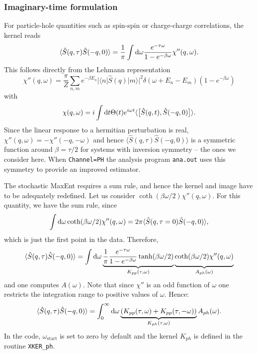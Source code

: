 \subsubsection*{Imaginary-time formulation}
 For particle-hole quantities such as spin-spin or charge-charge correlations, 
the kernel reads
\begin{equation}
	\langle \hat{S}(q,\tau) \hat{S}(-q,0) \rangle  = \frac{1}{\pi} 
   \int \mathrm{d} \omega  \frac{e^{- \tau \omega} }{ 1 - e^{-\beta  \omega} } \chi''(q,\omega).
\end{equation}
This follows directly from the  Lehmann representation
\begin{equation}
 \chi''(q,\omega)  = \frac{\pi}{Z} \sum_{n,m} e^{-\beta E_n} |\langle n | \hat{S}(q) | m \rangle |^2 
\delta ( \omega + E_n - E_m) \left( 1 - e^{-\beta  \omega} \right) 
\end{equation}
with 
\begin{equation*}
   \chi(q,\omega)  = i \int \mathrm{d} t \Theta(t)  e^{i \omega t} \langle \big[ \hat{S}(q,t), \hat{S}(-q,0) \big] \rangle .
\end{equation*}
Since the linear response to a hermitian perturbation  is real, $\chi''(q,\omega)  = - \chi''(-q,-\omega)$ and hence 
$\langle \hat{S}(q,\tau) \hat{S}(-q,0) \rangle $ is a symmetric function around $\beta= \tau/2$ for systems with 
inversion symmetry -- the ones we consider here.  When  \texttt{Channel=PH}  the analysis program \texttt{ana.out} uses this symmetry to provide an improved estimator. 

The  stochastic MaxEnt requires a sum rule, and hence the kernel and image have to be adequately redefined. 
Let us consider $\coth(\beta \omega/2) \chi''(q,\omega)$. For this quantity, we have the sum rule, since
\begin{equation}
	\int \mathrm{d} \omega 	\coth(\beta \omega/2) \chi''(q,\omega) = 
  2 \pi \langle \hat{S}(q,\tau=0) \hat{S}(-q,0) \rangle ,
\end{equation}
which is just the first point in the data. Therefore,
\begin{equation}
  \label{eqn:A_ph_def}
	\langle \hat{S}(q,\tau) \hat{S}(-q,0) \rangle  =  
       \int \d \omega  \underbrace{ \frac{1}{\pi} \frac{e^{- \tau \omega} }
            { 1 - e^{-\beta  \omega} } \tanh(\beta \omega/2)  }_{K_{pp}(\tau,\omega)} 
       \underbrace{ \coth(\beta \omega/2) \chi''(q,\omega) \vphantom{\frac{1}{2-1}} }_{A_{ph}(\omega)} 
\end{equation}
and one computes $A(\omega)$.
Note that since $\chi'' $ is an odd function of $\omega$ one restricts the integration range to positive values of $\omega$. 
Hence: 
\begin{equation}
	\langle \hat{S}(q,\tau) \hat{S}(-q,0) \rangle  =  
       \int_{0}^{\infty}  \mathrm{d} \omega \underbrace{\left( K_{pp}(\tau,\omega)  + K_{pp}(\tau,-\omega) \right)}_{K_{ph}(\tau,\omega)}  A_{ph}(\omega).
\end{equation}
In the code, $\omega_\mathrm{start}$ is set to zero by default and the kernel $K_{ph}$ is defined in the  routine \texttt{XKER\_ph}.

